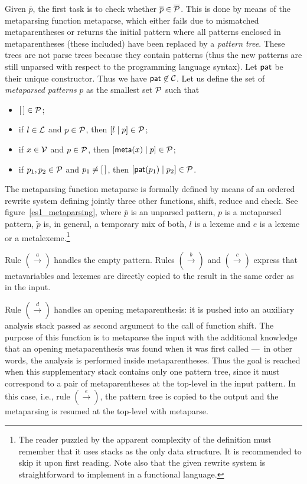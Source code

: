 Given \(\overline{p}\), the first task is to check whether
\(\overline{p} \in \overline{\cal P}\). This is done by means of the
meta\-parsing function \textsf{metaparse}, which either fails due to
mismatched meta\-parentheses or returns the initial pattern where all
patterns enclosed in meta\-parentheses (these included) have been
replaced by a \emph{pattern tree}. These trees are not parse trees
because they contain patterns (thus the new patterns are still
unparsed with respect to the programming language syntax). Let
\(\textsf{pat}\) be their unique constructor. Thus we have
\(\textsf{pat} \not\in {\cal C}\). Let us define the set of
\emph{meta\-parsed patterns} \(p\) as the smallest set \({\cal P}\)
such that
\begin{itemize}

  \item \([\,] \in {\cal P}\);

  \item if \(l \in {\cal L}\) and \(p \in {\cal P}\), then
    \([{l}\mid{p}] \in {\cal P}\);

  \item if \(x \in {\cal V}\) and \(p \in {\cal P}\), then
    \([{\textsf{meta}(x)}\mid{p}] \in {\cal P}\);

  \item if \(p_1, p_2 \in {\cal P}\) and \(p_1 \neq [\,]\), then
    \([{\textsf{pat}(p_1)}\mid{p_2}] \in {\cal P}\).

\end{itemize}
The meta\-parsing function \textsf{metaparse} is formally defined by
means of an ordered rewrite system defining jointly three other
functions, \textsf{shift}, \textsf{reduce} and \textsf{check}. See
figure~\ref{es1_metaparsing}, where \(\overline{p}\) is an unparsed
pattern, \(p\) is a meta\-parsed pattern, \(\tilde{p}\) is, in
general, a temporary mix of both, \(l\) is a lexeme and \(e\) is a
lexeme or a meta\-lexeme.\footnote{The reader puzzled by the apparent
complexity of the definition must remember that it uses stacks as the
only data structure. It is recommended to skip it upon first
reading. Note also that the given rewrite system is straightforward to
implement in a functional language.}

Rule \((\xrightarrow{a})\) handles the empty pattern. Rules
\((\xrightarrow{b})\) and \((\xrightarrow{c})\) express that
meta\-variables and lexemes are directly copied to the result in the
same order as in the input.

Rule \((\xrightarrow{d})\) handles an opening meta\-parenthesis: it is
pushed into an auxiliary analysis stack passed as second argument to
the call of function \textsf{shift}. The purpose of this function is
to metaparse the input with the additional knowledge that an opening
meta\-parenthesis was found when it was first called ---~in other
words, the analysis is performed inside meta\-parentheses. Thus the
goal is reached when this supplementary stack contains only one
pattern tree, since it must correspond to a pair of meta\-parentheses
at the top\hyp{}level in the input pattern. In this case, i.e., rule
\((\xrightarrow{e})\), the pattern tree is copied to the output and
the meta\-parsing is resumed at the top\hyp{}level with
\textsf{metaparse}.

